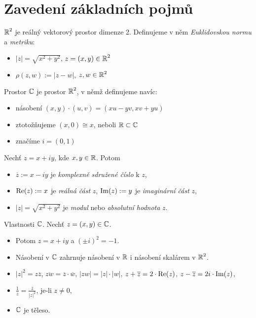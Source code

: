 \section{\texorpdfstring{Zavedení základních pojmů}{Zavedení základních pojmu}}
\vspace{5mm}
\large


\textbf{$\operatorname{\mathbb{R}} ^2$} je reálný vektorový prostor dimenze 2. Definujeme v něm \emph{Euklidovskou normu} a \emph{metriku}:
\begin{itemize}
    \item $|z| = \sqrt{x^2+y^2}$, $z = (x,y)\in\operatorname{\mathbb{R}} ^2$
    \item $\rho(z,w):= |z-w|$, $z,w\in\operatorname{\mathbb{R}} ^2$
\end{itemize}

\begin{definition}
Prostor $\operatorname{\mathbb{C}}  $ je prostor $\operatorname{\mathbb{R}} ^2$, v němž definujeme navíc:
\begin{itemize}
    \item násobení $(x,y)\cdot(u,v) = (xu-yv, xv+yu)$
    \item ztotožňujeme $(x,0) \cong x$, neboli $\operatorname{\mathbb{R}} \subset\operatorname{\mathbb{C}}  $
    \item značíme $i = (0,1)$
\end{itemize}
\end{definition}

\begin{notation}
Nechť $z = x+iy$, kde $x,y\in\operatorname{\mathbb{R}} $. Potom
\begin{itemize}
    \item $\overline{z}:= x-iy$ je \textit{komplexně sdružené číslo} k $z$,
    \item $\operatorname{Re}(z):= x$ je \textit{reálná část} $z$, $\operatorname{Im}(z):= y$ je \textit{imaginární část} $z$,
    \item $|z| = \sqrt{x^2+y^2}$ je \textit{modul} nebo \textit{absolutní hodnota} $z$.
\end{itemize}
\end{notation} 

\begin{properties}
Vlastnosti $\operatorname{\mathbb{C}}  $. Nechť $z = (x,y)\in\operatorname{\mathbb{C}}  $.
\begin{itemize}
    \item Potom $z = x+iy$ a $(\pm i)^2 = -1$.
    \item Násobení v $\operatorname{\mathbb{C}}  $ zahrnuje násobení v $\operatorname{\mathbb{R}} $ i násobení skalárem v $\operatorname{\mathbb{R}} ^2$.
    \item $|z|^2 = z\overline{z}$, $\overline{zw} = \overline{z} \cdot 
    \overline{w}$, $|zw| = |z|\cdot|w|$, $z+\overline{z} = 2\cdot \operatorname{Re}(z)$, $z-\overline{z} = 2i\cdot \operatorname{Im}(z)$,
    \item $\frac{1}{z} = \frac{\overline{z}}{|z|^2}$, je-li $z\neq 0$,
    \item $\operatorname{\mathbb{C}}  $ je těleso.
\end{itemize}
\end{properties}

